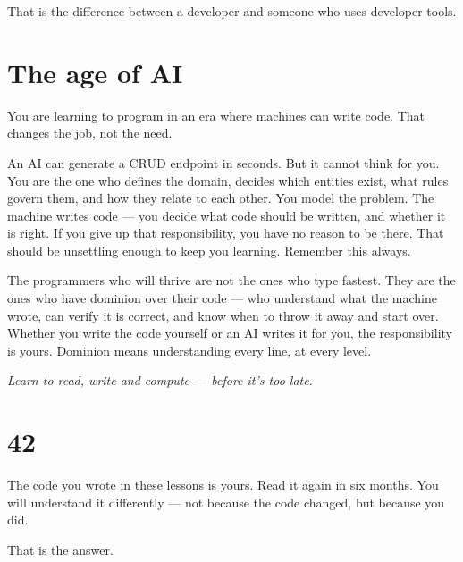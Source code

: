 \documentclass[11pt,a4paper,oneside]{book}
\begin{document}
That is the difference between a developer and someone who uses
developer tools.

\hypertarget{the-age-of-ai}{%
\section{The age of AI}\label{the-age-of-ai}}

You are learning to program in an era where machines can write
code. That changes the job, not the need.

An AI can generate a CRUD endpoint in seconds. But it cannot
think for you. You are the one who defines the domain, decides
which entities exist, what rules govern them, and how they relate
to each other. You model the problem. The machine writes code ---
you decide what code should be written, and whether it is right.
If you give up that responsibility, you have no reason to be
there. That should be unsettling enough to keep you learning.
Remember this always.

The programmers who will thrive are not the ones who type
fastest. They are the ones who have dominion over their code ---
who understand what the machine wrote, can verify it is correct,
and know when to throw it away and start over. Whether you write
the code yourself or an AI writes it for you, the responsibility
is yours. Dominion means understanding every line, at every
level.

\emph{Learn to read, write and compute --- before it's too late.}

\hypertarget{section}{%
\section{42}\label{section}}

The code you wrote in these lessons is yours. Read it again in
six months. You will understand it differently --- not because
the code changed, but because you did.

That is the answer.

\newpage
\end{document}
